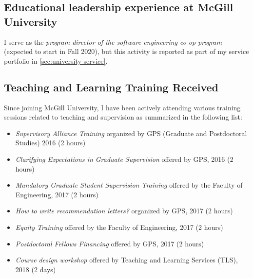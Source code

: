 \subsection{Educational leadership experience at McGill University}
I serve as the \emph{program director of the software engineering co-op program} (expected to start in Fall 2020), but this activity is reported as part of my service portfolio in \autoref{sec:university-service}.
 


\subsection{Teaching and Learning Training Received}
Since joining McGill University, I have been actively attending various training sessions related to teaching and supervision as summarized in the following list:

\begin{itemize}
\item \emph{Supervisory Alliance Training} organized by GPS (Graduate and Postdoctoral Studies)  2016 (2 hours)
\item \emph{Clarifying Expectations in Graduate Supervision} offered by GPS,  2016 (2 hours)
\item \emph{Mandatory Graduate Student Supervision Training} offered by the Faculty of Engineering,  2017 (2 hours)
\item \emph{How to write recommendation letters?} organized by GPS, 2017 (2 hours)
\item \emph{Equity Training} offered by the Faculty of Engineering, 2017 (2 hours)
\item \emph{Postdoctoral Fellows Financing} offered by GPS, 2017 (2 hours)
\item \emph{Course design workshop} offered by Teaching and Learning Services (TLS), 2018 (2 days)
\end{itemize}

